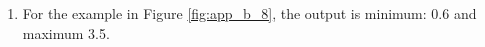 \begin{enumerate}
\item For the example in Figure \ref{fig:app_b_8}, the output is minimum: 0.6 and maximum 3.5.  

\end{enumerate}


